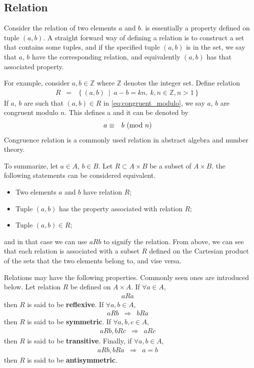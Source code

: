 \subsection{Relation}

Consider the relation of two elements $a$ and $b$.  is essentially a property defined on tuple $(a,b)$. A straight forward way of defining a relation is to construct a set that contains some tuples, and if the specified tuple $(a,b)$ is in the set, we say that $a$, $b$ have the corresponding relation, and equivalently $(a,b)$ has that associated property.

For example, consider $a,b\in\mathbb{Z}$ where $\mathbb{Z}$ denotes the integer set. Define relation
\begin{eqnarray}
	R &=& \left\{(a,b)~\middle|~a-b = kn,~k,n \in\mathbb{Z}, n>1\right\} \label{eq:congruent_modulo}
\end{eqnarray}
If $a$, $b$ are such that $(a,b)\in R$ in \eqref{eq:congruent_modulo}, we say $a$, $b$ are congruent modulo $n$. This defines a  and it can be denoted by
\begin{eqnarray}
	a &\equiv& b~(\textup{mod}~n) \nonumber
\end{eqnarray}
Congruence relation is a commonly used relation in abstract algebra and number theory.

To summarize, let $a\in A$, $b\in B$. Let $R\subset A\times B$ be a subset of $A\times B$. the following statements can be considered equivalent.
\begin{itemize}
	\item Two elements $a$ and $b$ have relation $R$;
	\item Tuple $(a,b)$ has the property associated with relation $R$;
	\item Tuple $(a,b) \in R$;
\end{itemize}
and in that case we can use $aRb$ to signify the relation. From above, we can see that each relation is associated with a subset $R$ defined on the Cartesian product of the sets that the two elements belong to, and vise versa.

Relations may have the following properties. Commonly seen ones are introduced below. Let relation $R$ be defined on $A \times A$. If $\forall a \in A$,
\begin{eqnarray}
	aRa \nonumber
\end{eqnarray}
then $R$ is said to be \textbf{reflexive}. If $\forall a,b \in A$,
\begin{eqnarray}
	aRb &\Rightarrow& bRa \nonumber
\end{eqnarray}
then $R$ is said to be \textbf{symmetric}. If $\forall a,b,c\in A$,
\begin{eqnarray}
	aRb, bRc &\Rightarrow& aRc \nonumber 
\end{eqnarray}
then $R$ is said to be \textbf{transitive}. Finally, if $\forall a,b \in A$,
\begin{eqnarray}
	aRb, bRa &\Rightarrow& a=b \nonumber 
\end{eqnarray}
then $R$ is said to be \textbf{antisymmetric}.

